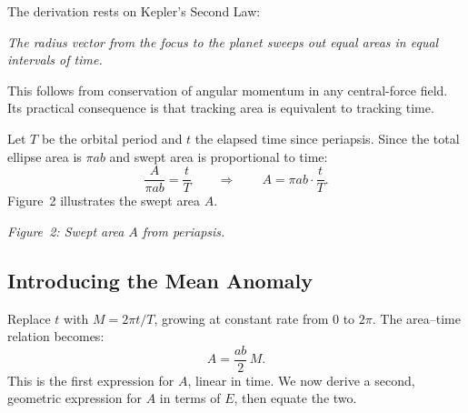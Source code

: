 \documentclass[12pt]{article}
\newenvironment{notebox}[1]{%
  \begin{tcolorbox}[
    enhanced, breakable,
    colback=blue!3!white, colframe=deepblue,
    boxrule=0.7pt, arc=4pt,
    title={\bfseries #1}
  ]
}{\end{tcolorbox}}
\begin{document}
The derivation rests on Kepler's Second Law: \\

\begin{notebox}{Kepler's Second Law}
{\textit{The radius vector from the focus to the planet sweeps out equal areas
in equal intervals of time.}}
\end{notebox}
\vspace{0.2cm}
\noindent

This follows from conservation of angular momentum in any central-force field.
Its practical consequence is that tracking area is equivalent to tracking time.

Let $T$ be the orbital period and $t$ the elapsed time since periapsis. Since the
total ellipse area is $\pi ab$ and swept area is proportional to time:
\[
  \frac{A}{\pi ab} = \frac{t}{T}
  \qquad\Longrightarrow\qquad
  A = \pi ab \cdot \frac{t}{T}.
\]
Figure~2 illustrates the swept area $A$.
\newpage

\vspace{0.3cm}
\begin{center}

\vspace{0.2cm}
{\small\textit{Figure~2: Swept area $A$ from periapsis.}}
\end{center}

\subsection{Introducing the Mean Anomaly}

Replace $t$ with $M = 2\pi t/T$, growing at constant rate from $0$ to $2\pi$.
The area--time relation becomes:
\[
  A = \frac{ab}{2}\,M. \tag{1}
\]
This is the first expression for $A$, linear in time. We now derive a second,
geometric expression for $A$ in terms of $E$, then equate the two.
\end{document}
